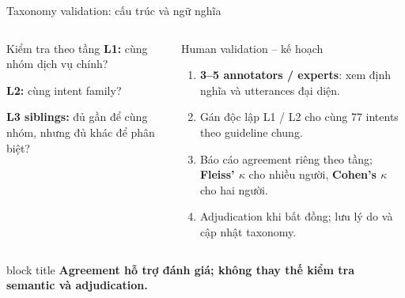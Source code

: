 \documentclass[10pt,aspectratio=169]{beamer}
\newcommand{\takeaway}[1]{
  \par\vspace{0.18cm}
  \begin{beamercolorbox}[wd=\textwidth,sep=6pt,center]{block title}
    \small\bfseries #1
  \end{beamercolorbox}
}
\begin{document}
\begin{frame}{Taxonomy validation: cấu trúc và ngữ nghĩa}
\small
\begin{columns}[T,onlytextwidth]
\begin{uitbox}{Kiểm tra theo tầng}
\textbf{L1:} cùng nhóm dịch vụ chính?\par\vspace{0.12cm}
\textbf{L2:} cùng intent family?\par\vspace{0.12cm}
\textbf{L3 siblings:} đủ gần để cùng nhóm, nhưng đủ khác để phân biệt?
\end{uitbox}
\vspace{0.1cm}
\begin{greenbox}{Human validation -- kế hoạch}
\begin{enumerate}\setlength{\itemsep}{4pt}
\item \textbf{3--5 annotators / experts}: xem định nghĩa và utterances đại diện.
\item Gán độc lập L1 / L2 cho cùng 77 intents theo guideline chung.
\item Báo cáo agreement riêng theo tầng; \textbf{Fleiss' $\kappa$} cho nhiều người, \textbf{Cohen's $\kappa$} cho hai người.
\item Adjudication khi bất đồng; lưu lý do và cập nhật taxonomy.
\end{enumerate}
\end{greenbox}
\end{columns}
\takeaway{Agreement hỗ trợ đánh giá; không thay thế kiểm tra semantic và adjudication.}
\end{frame}
\end{document}
